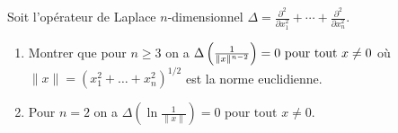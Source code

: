 \documentclass{tp_um}
\begin{document}
\exo[*]{}  Soit l'op\'erateur de Laplace $n$-dimensionnel $\Delta = \frac{\partial^2}{\partial x_1^2}+\cdots + \frac{\partial^2}{\partial x_n^2}$.
\begin{enumerate}
    \item Montrer que pour $n\ge 3$ on a $\Delta \left( \frac{1}{\lVert x\rVert^{n-2}} \right) = 0\mbox{ pour tout } x\not= 0$ o\`u $\| x \| = \left( x_1^2+\dots +x_n^2  \right)^{1/2}$ est la norme euclidienne.
    \item  Pour $n=2$ on a $\Delta \left( \ln \frac{1}{\|x\|} \right) = 0 \mbox{ pour tout } x\neq 0.$
\end{enumerate}
\end{document}

